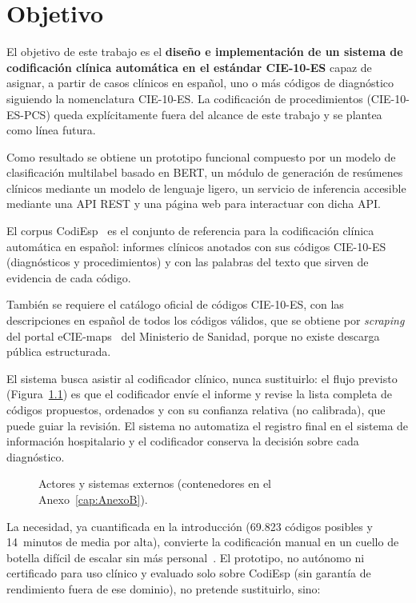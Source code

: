 \chapter{Objetivo}
\label{cap:Objetivo}

El objetivo de este trabajo es el \textbf{diseño e implementación de un sistema de codificación clínica automática en el estándar CIE-10-ES} capaz de asignar, a partir de casos clínicos en español, uno o más códigos de diagnóstico siguiendo la nomenclatura CIE-10-ES. La codificación de procedimientos (CIE-10-ES-PCS) queda explícitamente fuera del alcance de este trabajo y se plantea como línea futura.

Como resultado se obtiene un prototipo funcional compuesto por un modelo de clasificación multilabel basado en BERT, un módulo de generación de resúmenes clínicos mediante un modelo de lenguaje ligero, un servicio de inferencia accesible mediante una API REST y una página web para interactuar con dicha API.

El corpus CodiEsp~\cite{miranda2020} es el conjunto de referencia para la codificación clínica automática en español: informes clínicos anotados con sus códigos CIE-10-ES (diagnósticos y procedimientos) y con las palabras del texto que sirven de evidencia de cada código.

También se requiere el catálogo oficial de códigos CIE-10-ES, con las descripciones en español de todos los códigos válidos, que se obtiene por \emph{scraping} del portal eCIE-maps~\cite{eciemaps2024} del Ministerio de Sanidad, porque no existe descarga pública estructurada.

El sistema busca asistir al codificador clínico, nunca sustituirlo: el flujo previsto (Figura~\ref{fig:c4-contexto}) es que el codificador envíe el informe y revise la lista completa de códigos propuestos, ordenados y con su confianza relativa (no calibrada), que puede guiar la revisión. El sistema no automatiza el registro final en el sistema de información hospitalario y el codificador conserva la decisión sobre cada diagnóstico.

\begin{figure}[ht]
\centering
\resizebox{0.8\textwidth}{!}{}
\caption{Actores y sistemas externos (contenedores en el Anexo~\ref{cap:AnexoB}).}
\label{fig:c4-contexto}
\end{figure}

La necesidad, ya cuantificada en la introducción (69.823 códigos posibles y 14~minutos de media por alta), convierte la codificación manual en un cuello de botella difícil de escalar sin más personal~\cite{sanidad2016cie10}. El prototipo, no autónomo ni certificado para uso clínico y evaluado solo sobre CodiEsp (sin garantía de rendimiento fuera de ese dominio), no pretende sustituirlo, sino:

